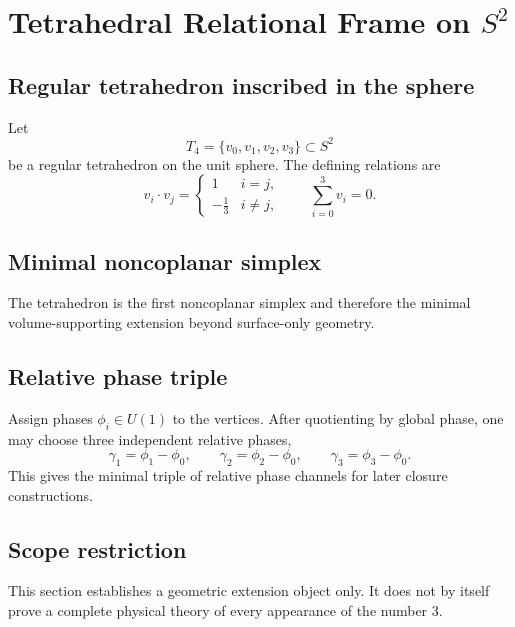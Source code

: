 \section{Tetrahedral Relational Frame on $S^2$}
\label{sec:tetrahedral-relational-frame}

\subsection{Regular tetrahedron inscribed in the sphere}
Let
\begin{equation}
T_4 = \{v_0,v_1,v_2,v_3\} \subset S^2
\end{equation}
be a regular tetrahedron on the unit sphere. The defining relations are
\begin{equation}
v_i \cdot v_j =
\begin{cases}
1 & i=j, \\
-\frac{1}{3} & i\neq j,
\end{cases}
\qquad
\sum_{i=0}^3 v_i = 0.
\end{equation}

\subsection{Minimal noncoplanar simplex}
The tetrahedron is the first noncoplanar simplex and therefore the minimal volume-supporting extension beyond surface-only geometry.

\subsection{Relative phase triple}
Assign phases $\phi_i \in U(1)$ to the vertices. After quotienting by global phase, one may choose three independent relative phases,
\begin{equation}
\gamma_1 = \phi_1 - \phi_0,
\qquad
\gamma_2 = \phi_2 - \phi_0,
\qquad
\gamma_3 = \phi_3 - \phi_0.
\end{equation}
This gives the minimal triple of relative phase channels for later closure constructions.

\subsection{Scope restriction}
This section establishes a geometric extension object only. It does not by itself prove a complete physical theory of every appearance of the number $3$.
